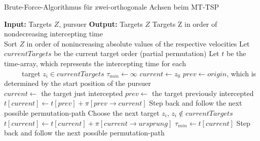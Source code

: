 \documentclass[german,version-2019-11]{uzl-thesis}
\begin{document}
\begin{minipage}{1\linewidth}
\begin{algorithm}[H]
\begin{algorithmic}
\caption{Brute-Force-Algorithmus für zwei-orthogonale Achsen beim MT-TSP}
\label{alg:BF}
\State \textbf{Input:} Targets $Z$, pursuer
\State \textbf{Output:} Targets $Z$ Targets Z in order of nondecreasing intercepting time\\

\State Sort $Z$ in order of nonincreasing absolute values of the respective velocities
\State Let $currentTargets$ be the current target order (partial permutation)
\State Let $t$ be the time-array, which represents the intercepting time for each \\
~~~~~target $z_i\in currentTargets$ 
\State $\tau_{min}\leftarrow \infty$
\State $current\leftarrow z_0$
\State $prev\leftarrow origin$, which is determined by the start position of the pursuer\\

\State $current\leftarrow$ the target just intercepted
\State $prev\leftarrow$ the target previously intercepted 
\State $t[current] \leftarrow t[prev] + \pi[prev\rightarrow current]$
\State Step back and follow the next possible permutation-path
\Else
{}
\State Choose the next target $z_i$, $z_i\notin currentTargets$
\Else
\State $t[current]\leftarrow t[current] + \pi[current\rightarrow ursprung]$ 
\State $\tau_{min}\leftarrow t[current]$
\State Step back and follow the next possible permutation-path
\EndIf 
\EndIf
\EndIf
\EndWhile
\end{algorithmic}
\end{algorithm}
\end{minipage}
\end{document}
